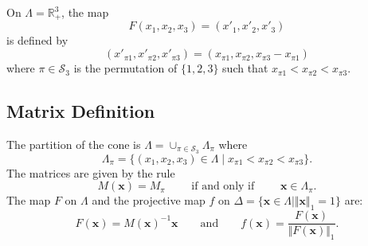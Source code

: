 On $\Lambda=\mathbb{R}^3_+$, the map
\[
F (x_1,x_2,x_3) = (x'_1,x'_2,x'_3)
\]
is defined by
\[
    (x'_{\pi 1}, x'_{\pi 2}, x'_{\pi 3}) =
    (x_{\pi 1}, x_{\pi 2}, x_{\pi 3}-x_{\pi 1})
\]
where $\pi\in\mathcal{S}_3$ is the permutation of $\{1,2,3\}$ such that
$x_{\pi 1}<x_{\pi 2}<x_{\pi 3}$.
\subsection{Matrix Definition}
The partition of the cone is
$\Lambda=\cup_{\pi\in\mathcal{S}_3}\Lambda_\pi$ where
\[
    \Lambda_\pi = \{(x_1,x_2,x_3)\in\Lambda\mid 
	x_{\pi 1}< x_{\pi 2}< x_{\pi 3}\}.
\]
The matrices are given by the rule
\[
    M(\mathbf{x}) = M_\pi
    \qquad\text{ if and only if }\qquad
    \mathbf{x}\in\Lambda_\pi.
\]
The map $F$ on $\Lambda$ and
the projective map $f$ on
$\Delta=\{\mathbf{x}\in\Lambda\mid\Vert\mathbf{x}\Vert_1=1\}$ are:
\[
    F(\mathbf{x}) = M(\mathbf{x})^{-1}\mathbf{x}
    \qquad\text{and}\qquad
    f(\mathbf{x}) = \frac{F(\mathbf{x})}{\Vert F(\mathbf{x})\Vert_1}.
\]
